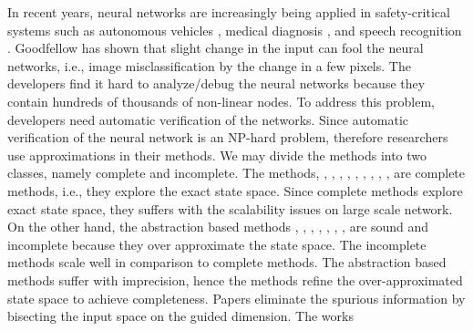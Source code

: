 










In recent years, neural networks are increasingly being applied in
safety-critical systems such as autonomous vehicles \cite{bojarski2016end},
medical diagnosis \cite{amato2013artificial}, and speech recognition \cite{hinton2012deep}.
Goodfellow \cite{goodfellow2014explaining} has shown that slight change in the input can fool the neural networks,
i.e., image misclassification by the change in a few pixels.
The developers find it hard to analyze/debug the neural networks because they contain hundreds of thousands of non-linear nodes.
To address this problem, developers need automatic verification of the networks.
Since automatic verification of the neural network is an NP-hard problem, therefore researchers use approximations in their methods.
We may divide the methods into two classes, namely complete and incomplete.
The methods\cite{lomuscio2017approach}, \cite{fischetti2018deep},
\cite{dutta2018output}, \cite{cheng2017maximum}, \cite{katz2017reluplex}, \cite{katz2019marabou}, 
\cite{ehlers2017formal}, \cite{huang2017safety}, \cite{wang2021beta}, \cite{xu2020fast}, \cite{zhang2022general}
are complete methods, i.e., they explore the exact state space.
Since complete methods explore exact state space, they suffers with the scalability issues on large scale network.
On the other hand, the abstraction based methods
\cite{dvijotham2018dual}, \cite{gehr2018ai2}, \cite{singh2018fast},
 \cite{singh2018boosting}, \cite{weng2018towards}, \cite{wong2018provable}, \cite{zhang2018efficient}, \cite{zhang2018efficient}
are sound and incomplete because they over approximate the state space.
The incomplete methods scale well in comparison to complete methods. 
The abstraction based methods suffer with imprecision, hence the methods
\cite{wang2018formal,wang2018efficient,elboher2020abstraction,yang2021improving,lin2020art}
refine the over-approximated state space to achieve completeness. 
Papers \cite{wang2018formal,wang2018efficient,lin2020art} eliminate the
spurious information by bisecting the input space on the guided dimension. The \cite{yang2021improving} works
